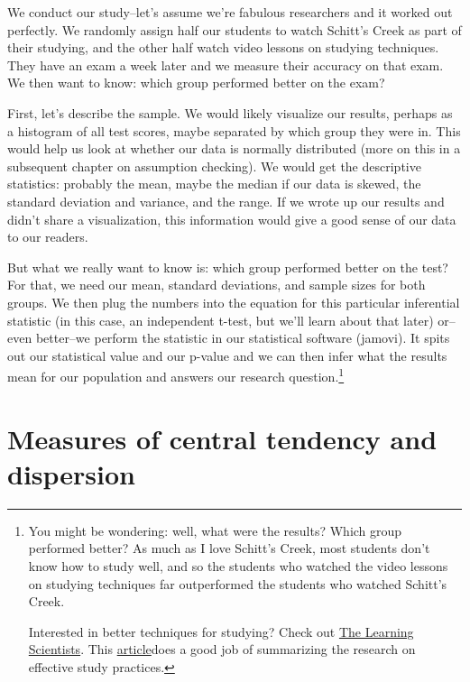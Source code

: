 \documentclass[
]{book}
\begin{document}
We conduct our study--let's assume we're fabulous researchers and it worked out perfectly. We randomly assign half our students to watch Schitt's Creek as part of their studying, and the other half watch video lessons on studying techniques. They have an exam a week later and we measure their accuracy on that exam. We then want to know: which group performed better on the exam?

First, let's describe the sample. We would likely visualize our results, perhaps as a histogram of all test scores, maybe separated by which group they were in. This would help us look at whether our data is normally distributed (more on this in a subsequent chapter on assumption checking). We would get the descriptive statistics: probably the mean, maybe the median if our data is skewed, the standard deviation and variance, and the range. If we wrote up our results and didn't share a visualization, this information would give a good sense of our data to our readers.

But what we really want to know is: which group performed better on the test? For that, we need our mean, standard deviations, and sample sizes for both groups. We then plug the numbers into the equation for this particular inferential statistic (in this case, an independent t-test, but we'll learn about that later) or--even better--we perform the statistic in our statistical software (jamovi). It spits out our statistical value and our p-value and we can then infer what the results mean for our population and answers our research question.\footnote{You might be wondering: well, what were the results? Which group performed better? As much as I love Schitt's Creek, most students don't know how to study well, and so the students who watched the video lessons on studying techniques far outperformed the students who watched Schitt's Creek.

  Interested in better techniques for studying? Check out \href{https://www.learningscientists.org/blog/category/For+Students}{The Learning Scientists}. This \href{https://www.learningscientists.org/blog/2020/1/9-1}{article}does a good job of summarizing the research on effective study practices.}

\hypertarget{measures-of-central-tendency-and-dispersion}{%
\section{Measures of central tendency and dispersion}\label{measures-of-central-tendency-and-dispersion}}
\end{document}
